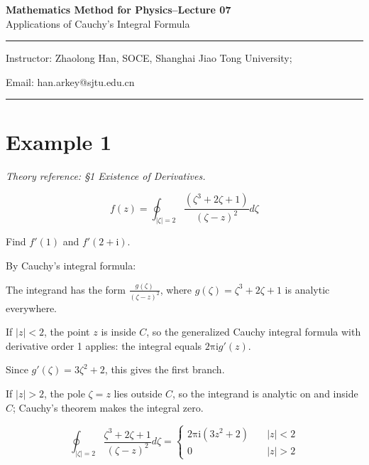 \documentclass[11pt,a4paper]{article}
\theoremstyle{definition}
\theoremstyle{plain}
\begin{document}
\begin{center}
    {\LARGE \textbf{Mathematics Method for Physics--Lecture 07}} \\[0.6em]
    {\large Applications of Cauchy's Integral Formula}
\end{center}
\vspace{-0.5em}
\noindent\rule{\textwidth}{0.5pt}
\vspace{0.3em}

\begin{center}
    Instructor: Zhaolong Han, SOCE, Shanghai Jiao Tong University;
\end{center}

\vspace{-0.6em}
\noindent Email: han.arkey@sjtu.edu.cn

\vspace{0.4em}
\noindent\rule{\textwidth}{0.5pt}

\vspace{0.8em}
\section*{Example 1}

\textit{Theory reference: §1 Existence of Derivatives.}

\begin{equation}
f(z) = \oint_{\vert{}\zeta\vert{} = 2}\frac{(\zeta^{3} + 2\zeta + 1)}{(\zeta - z)^{2}}d\zeta
\end{equation}

Find $f'(1)$ and $f'(2 + \mathrm{i})$.

By Cauchy’s integral formula:

The integrand has the form $\frac{g(\zeta)}{(\zeta - z)^{2}}$, where $g(\zeta) = \zeta^{3} + 2\zeta + 1$ is analytic everywhere.

If $\vert{}z\vert{} < 2$, the point $z$ is inside $C$, so the generalized Cauchy integral formula with derivative order 1 applies: the integral equals $2\mathrm{\pi}\mathrm{i}g'(z)$.

Since $g'(\zeta) = 3\zeta^{2} + 2$, this gives the first branch.

If $\vert{}z\vert{} > 2$, the pole $\zeta = z$ lies outside $C$, so the integrand is analytic on and inside $C$; Cauchy’s theorem makes the integral zero.

\begin{equation}
\oint_{\vert{}\zeta\vert{} = 2}\frac{\zeta^{3} + 2\zeta + 1}{{(\zeta - z)}^{2}}d\zeta = \begin{cases} 2\mathrm{\pi}\mathrm{i}(3z^{2} + 2)\quad & \vert{}z\vert{} < 2 \\ 0 & \vert{}z\vert{} > 2 \end{cases}
\end{equation}
\end{document}

